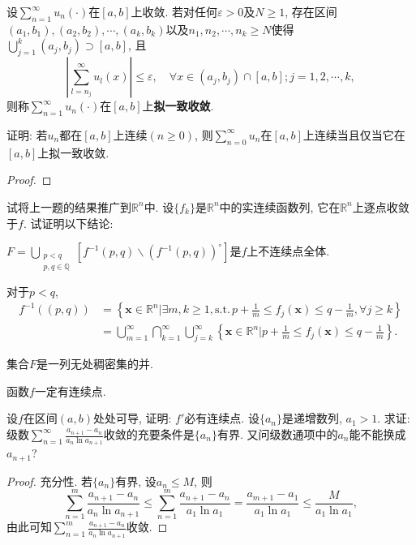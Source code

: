 \begin{quizb}
\woe 设\(\sum_{n=1}^{\infty}u_n(\cdot)\)在\([a,b]\)上收敛. 若对任何\(\varepsilon>0\)及\(N\geqslant 1\), 存在区间\((a_1,b_1),(a_2,b_2),\cdots,(a_k,b_k)\)以及\(n_1,n_2,\cdots,n_k\geqslant N\)使得\(\bigcup_{j=1}^{k}(a_j,b_j)\supset [a,b]\), 且\[\left|\sum_{l=n_j}^{\infty}u_l(x)\right|\leqslant\varepsilon,\quad\forall x\in(a_j,b_j)\cap[a,b];j=1,2,\cdots,k,\]则称\(\sum_{n=1}^{\infty}u_n(\cdot)\)在\([a,b]\)上\textbf{拟一致收敛}.

证明: 若\(u_n\)都在\([a,b]\)上连续\((n\geqslant 0)\), 则\(\sum_{n=0}^{\infty}u_n\)在\([a,b]\)上连续当且仅当它在\([a,b]\)上拟一致收敛.
\begin{proof}
	
\end{proof}
\woe 试将上一题的结果推广到\(\mathbb{R}^n\)中.
\woe 设\(\{f_k\}\)是\(\mathbb{R}^n\)中的实连续函数列, 它在\(\mathbb{R}^n\)上逐点收敛于\(f\). 试证明以下结论:\begin{compactenum}[(i)]
\item \(F=\bigcup_{\substack{p<q\\p,q\in\mathbb{Q}}}\left[f^{-1}(p,q)\backslash\left(f^{-1}(p,q)\right)^\circ\right]\)是\(f\)上不连续点全体.
\item 对于\(p<q\),\[\begin{split}
f^{-1}\left((p,q)\right)&=\left\lbrace \boldsymbol{x}\in\mathbb{R}^n\big|\exists m,k\geqslant 1,\mathrm{s.t.}\, p+\frac{1}{m}\leqslant f_j(\boldsymbol{x})\leqslant q-\frac{1}{m},\forall j\geqslant k\right\rbrace\\
&=\bigcup_{m=1}^{\infty}\bigcap_{k=1}^{\infty}\bigcup_{j=k}^{\infty}\left\lbrace\boldsymbol{x}\in\mathbb{R}^n\big| p+\frac{1}{m}\leqslant f_j(\boldsymbol{x})\leqslant q-\frac{1}{m}\right\rbrace. 
\end{split}\]
\item 集合\(F\)是一列无处稠密集的并.
\item 函数\(f\)一定有连续点.
\end{compactenum}
\woe 设\(f\)在区间\((a,b)\)处处可导, 证明: \(f'\)必有连续点.
\woe 设\(\{a_n\}\)是递增数列, \(a_1>1\). 求证: 级数\(\sum_{n=1}^{\infty}\frac{a_{n+1}-a_n}{a_n\ln a_{n+1}}\)收敛的充要条件是\(\{a_n\}\)有界. 又问级数通项中的\(a_n\)能不能换成\(a_{n+1}\)?
\begin{proof}
充分性. 若\(\{a_n\}\)有界, 设\(a_n\leqslant M\), 则\[\sum_{n=1}^{m}\frac{a_{n+1}-a_n}{a_n\ln a_{n+1}}\leqslant\sum_{n=1}^{m}\frac{a_{n+1}-a_n}{a_1\ln a_1}=\frac{a_{m+1}-a_1}{a_1\ln a_1}\leqslant\frac{M}{a_1\ln a_1},\]由此可知\(\sum_{n=1}^{m}\frac{a_{n+1}-a_n}{a_n\ln a_{n+1}}\)收敛.


\end{proof}
\end{quizb}
